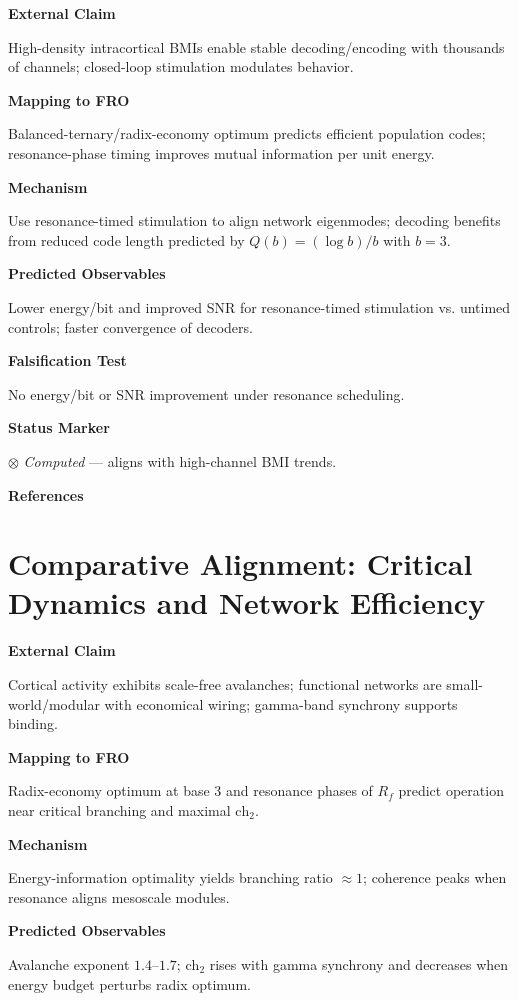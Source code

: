 \textbf{External Claim}

High-density intracortical BMIs enable stable decoding/encoding with thousands of channels; closed-loop stimulation modulates behavior.

\textbf{Mapping to FRO}

Balanced-ternary/radix-economy optimum predicts efficient population codes; resonance-phase timing improves mutual information per unit energy.

\textbf{Mechanism}

Use resonance-timed stimulation to align network eigenmodes; decoding benefits from reduced code length predicted by $Q(b)=(\log b)/b$ with $b=3$.

\textbf{Predicted Observables}

Lower energy/bit and improved SNR for resonance-timed stimulation vs. untimed controls; faster convergence of decoders.

\textbf{Falsification Test}

No energy/bit or SNR improvement under resonance scheduling.

\textbf{Status Marker}

$\otimes$ \textit{Computed} --- aligns with high-channel BMI trends.

\textbf{References}

\cite{musk2019integrated,shanechi2019brainmachine,willett2021highperformance}

\section{Comparative Alignment: Critical Dynamics and Network Efficiency}

\textbf{External Claim}

Cortical activity exhibits scale-free avalanches; functional networks are small-world/modular with economical wiring; gamma-band synchrony supports binding.

\textbf{Mapping to FRO}

Radix-economy optimum at base 3 and resonance phases of $R_f$ predict operation near critical branching and maximal $\text{ch}_2$.

\textbf{Mechanism}

Energy-information optimality yields branching ratio $\approx 1$; coherence peaks when resonance aligns mesoscale modules.

\textbf{Predicted Observables}

Avalanche exponent $1.4$--$1.7$; $\text{ch}_2$ rises with gamma synchrony and decreases when energy budget perturbs radix optimum.

